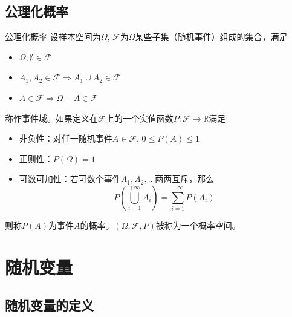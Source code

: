 
\subsection{公理化概率}


\begin{frame}

\begin{block}{公理化概率}
设样本空间为$\Omega$, $\mathcal{F}$为$\Omega$某些子集（随机事件）组成的集合，满足
\begin{itemize}
\item $\Omega, \emptyset \in \mathcal{F}$
\item $A_1,A_2\in \mathcal{F} \Longrightarrow A_1\cup A_2 \in \mathcal{F}$
\item $A\in \mathcal{F} \Longrightarrow \Omega - A \in \mathcal{F}$
\end{itemize}
称作事件域。如果定义在$\mathcal{F}$上的一个实值函数$P: \mathcal{F} \to \mathbb{R}$满足
\begin{itemize}
\item 非负性：对任一随机事件$A\in\mathcal{F}$, $0 \le P(A) \le 1$
\item 正则性：$P(\Omega) = 1$
\item 可数可加性：若可数个事件$A_1,A_2,\ldots$两两互斥，那么
$$P(\bigcup\limits_{i=1}^{+\infty} A_i) = \sum\limits_{i=1}^{+\infty} P(A_i)$$
\end{itemize}
则称$P(A)$为事件$A$的概率。$(\Omega, \mathcal{F}, P)$被称为一个概率空间。
\end{block}

\end{frame}


\section{随机变量}


\subsection{随机变量的定义}


